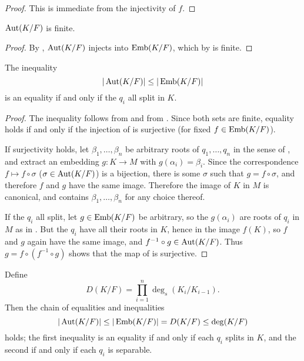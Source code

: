 \begin{proof} This is immediate from the injectivity of $f$. \end{proof}

\begin{corollary} $\operatorname{\text{Aut}}(K/F)$ is finite.
\label{aut_fin}
\end{corollary}

\begin{proof} By , $\operatorname{\text{Aut}}(K/F)$ injects into $\operatorname{\text{Emb}}(K/F)$, which by
 is finite. \end{proof}

\begin{proposition} The inequality
\begin{equation*}
|\operatorname{\text{Aut}}(K/F)| \leq |\operatorname{\text{Emb}}(K/F)|
\end{equation*}
is an equality if and only if the $q_i$ all split in $K$.
\label{aut_ineq}
\end{proposition}

\begin{proof} The inequality follows from  and from .
Since both sets are finite, equality holds if and only if the injection of
 is surjective (for fixed $f \in \operatorname{\text{Emb}}(K/F)$).

If surjectivity holds, let $\beta_1, \dots, \beta_n$ be arbitrary roots of
$q_1, \dots, q_n$ in the sense of , and extract an embedding $g
\colon K \to M$ with $g(\alpha_i) = \beta_i$.  Since the correspondence $f
\mapsto f \circ \sigma$ ($\sigma \in \operatorname{\text{Aut}}(K/F)$) is a bijection, there is some
$\sigma$ such that $g = f \circ \sigma$, and therefore $f$ and $g$ have the
same image.  Therefore the image of $K$ in $M$ is canonical, and contains
$\beta_1, \dots, \beta_n$ for any choice thereof.

If the $q_i$ all split, let $g \in \operatorname{\text{Emb}}(K/F)$ be arbitrary, so the
$g(\alpha_i)$ are roots of $q_i$ in $M$ as in .  But the $q_i$
have all their roots in $K$, hence in the image $f(K)$, so $f$ and $g$ again
have the same image, and $f^{-1} \circ g \in \operatorname{\text{Aut}}(K/F)$.  Thus $g = f \circ
(f^{-1} \circ g)$ shows that the map of  is surjective.
\end{proof}

\begin{corollary} Define
\begin{equation*}
D(K/F) = \prod_{i = 1}^n \deg_s(K_i/K_{i - 1}).
\end{equation*}
Then the chain of equalities and inequalities
\begin{equation*}
|\operatorname{\text{Aut}}(K/F)| \leq |\operatorname{\text{Emb}}(K/F)| = D(K/F) \leq \deg(K/F)
\end{equation*}
holds; the first inequality is an equality if and only if each $q_i$ splits in
$K$, and the second if and only if each $q_i$ is separable.
\label{large_aut_ineq}
\end{corollary}

